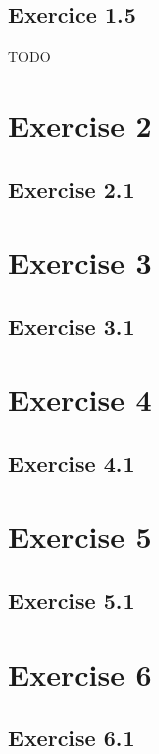 \documentclass[a4paper]{article}
\begin{document}
\subsection{Exercice 1.5}
\noindent TODO

\section{Exercise 2}
\subsection{Exercise 2.1}
\indent \indent 



\section{Exercise 3}
\subsection{Exercise 3.1}
\indent \indent 



\section{Exercise 4}
\subsection{Exercise 4.1}
\indent \indent 



\section{Exercise 5}
\subsection{Exercise 5.1}
\indent \indent 



\section{Exercise 6}
\subsection{Exercise 6.1}
\indent \indent 

\end{document}
